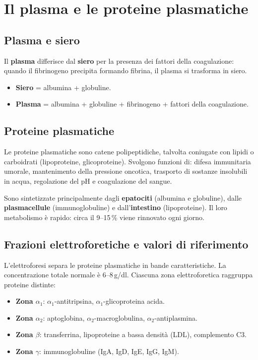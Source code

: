 \section{Il plasma e le proteine plasmatiche}

\subsection{Plasma e siero}

Il \textbf{plasma} differisce dal \textbf{siero} per la presenza dei fattori
della coagulazione: quando il fibrinogeno precipita formando fibrina, il plasma
si trasforma in siero.

\begin{itemize}
  \item \textbf{Siero} = albumina + globuline.
  \item \textbf{Plasma} = albumina + globuline + fibrinogeno + fattori della
    coagulazione.
\end{itemize}

\subsection{Proteine plasmatiche}

Le proteine plasmatiche sono catene polipeptidiche, talvolta coniugate con
lipidi o carboidrati (lipoproteine, glicoproteine). Svolgono funzioni di:
difesa immunitaria umorale, mantenimento della pressione oncotica, trasporto
di sostanze insolubili in acqua, regolazione del pH e coagulazione del sangue.

Sono sintetizzate principalmente dagli \textbf{epatociti} (albumina e
globuline), dalle \textbf{plasmacellule} (immunoglobuline) e
dall'\textbf{intestino} (lipoproteine). Il loro metabolismo è rapido: circa
il 9--15\,\% viene rinnovato ogni giorno.

\subsection{Frazioni elettroforetiche e valori di riferimento}

L'elettroforesi separa le proteine plasmatiche in bande caratteristiche. La
concentrazione totale normale è 6--8\,g/dl. Ciascuna zona elettroforetica
raggruppa proteine distinte:

\begin{itemize}
  \item \textbf{Zona $\alpha_1$}: $\alpha_1$-antitripsina, $\alpha_1$-glicoproteina
    acida.
  \item \textbf{Zona $\alpha_2$}: aptoglobina, $\alpha_2$-macroglobulina,
    $\alpha_2$-antiplasmina.
  \item \textbf{Zona $\beta$}: transferrina, lipoproteine a bassa densità (LDL),
    complemento C3.
  \item \textbf{Zona $\gamma$}: immunoglobuline (IgA, IgD, IgE, IgG, IgM).
\end{itemize}

